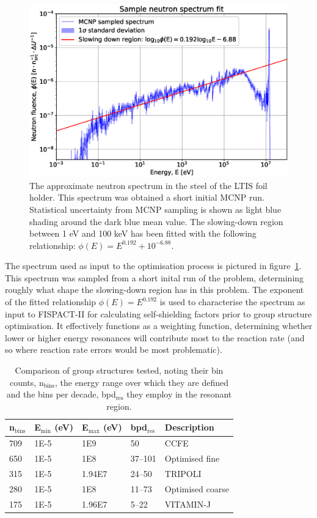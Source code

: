 \begin{figure}[H]
  \centering
  \includegraphics[width=\linewidth]{spectrum}
  \caption{The approximate neutron spectrum in the steel of the LTIS foil holder. This spectrum was obtained a short initial MCNP run. Statistical uncertainty from MCNP sampling is shown as light blue shading around the dark blue mean value. The slowing-down region between 1 eV and 100 keV has been fitted with the following relationship: $\phi(E) = E^{0.192} + 10^{-6.88}$.}
  \label{fig:opt_spectrum}
\end{figure}

The spectrum used as input to the optimisation process is pictured in figure~\ref{fig:opt_spectrum}. This spectrum was sampled from a short inital run of the problem, determining roughly what shape the slowing-down region has in this problem. The exponent of the fitted relationship $\phi(E) = E^{0.192}$ is used to characterise the spectrum as input to FISPACT-II for calculating self-shielding factors prior to group structure optimisation. It effectively functions as a weighting function, determining whether lower or higher energy resonances will contribute most to the reaction rate (and so where reaction rate errors would be most problematic).

\begin{table}[H]
  \centering
  \begin{tabular}{lllll}
    \toprule
    n$_\mathrm{bins}$ & E$_\mathrm{min}$ (eV) & E$_\mathrm{max}$ (eV) & bpd$_\mathrm{res}$ & Description \\ 
    \midrule
    709 & 1E-5 & 1E9 & 50 & CCFE \\
    650 & 1E-5 & 1E8 & 37--101 & Optimised fine \\
    315 & 1E-5 & 1.94E7 & 24--50 & TRIPOLI  \\
    280 & 1E-5 & 1E8 & 11--73 & Optimised coarse \\ 
    175 & 1E-5 & 1.96E7 & 5--22 & VITAMIN-J \\
    \bottomrule
  \end{tabular}
  \caption{Comparison of group structures tested, noting their bin counts, n$_\mathrm{bins}$, the energy range over which they are defined and the bins per decade, bpd$_\mathrm{res}$ they employ in the resonant region.}
  \label{tab:groups}
\end{table}

